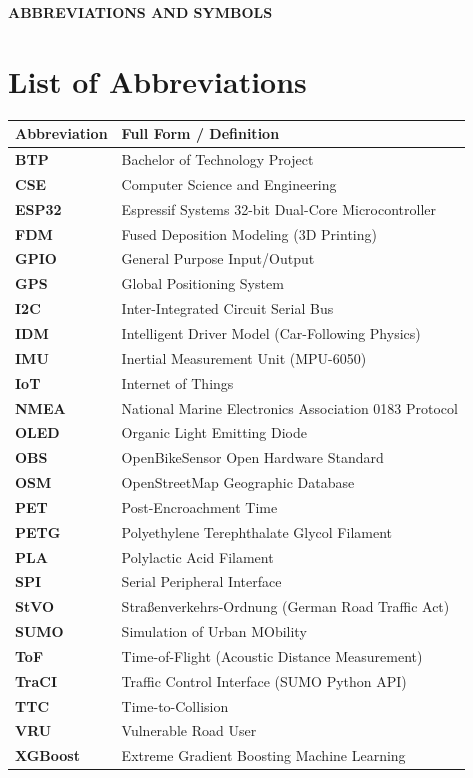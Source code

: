 \begin{center}
	\fontsize{16pt}{22pt}\selectfont \textbf{\MakeUppercase{Abbreviations and Symbols}}
\end{center}
\vspace{0.5cm}

\section*{List of Abbreviations}
\begin{table}[h!]
	\centering
	\setlength{\tabcolsep}{10pt}
	\renewcommand{\arraystretch}{1.25}
	\begin{tabularx}{\textwidth}{p{3.2cm}X}
		\toprule
		\textbf{Abbreviation} & \textbf{Full Form / Definition} \\
		\midrule
		\textbf{BTP} & Bachelor of Technology Project \\
		\textbf{CSE} & Computer Science and Engineering \\
		\textbf{ESP32} & Espressif Systems 32-bit Dual-Core Microcontroller \\
		\textbf{FDM} & Fused Deposition Modeling (3D Printing) \\
		\textbf{GPIO} & General Purpose Input/Output \\
		\textbf{GPS} & Global Positioning System \\
		\textbf{I2C} & Inter-Integrated Circuit Serial Bus \\
		\textbf{IDM} & Intelligent Driver Model (Car-Following Physics) \\
		\textbf{IMU} & Inertial Measurement Unit (MPU-6050) \\
		\textbf{IoT} & Internet of Things \\
		\textbf{NMEA} & National Marine Electronics Association 0183 Protocol \\
		\textbf{OLED} & Organic Light Emitting Diode \\
		\textbf{OBS} & OpenBikeSensor Open Hardware Standard \\
		\textbf{OSM} & OpenStreetMap Geographic Database \\
		\textbf{PET} & Post-Encroachment Time \\
		\textbf{PETG} & Polyethylene Terephthalate Glycol Filament \\
		\textbf{PLA} & Polylactic Acid Filament \\
		\textbf{SPI} & Serial Peripheral Interface \\
		\textbf{StVO} & Stra{\ss}enverkehrs-Ordnung (German Road Traffic Act) \\
		\textbf{SUMO} & Simulation of Urban MObility \\
		\textbf{ToF} & Time-of-Flight (Acoustic Distance Measurement) \\
		\textbf{TraCI} & Traffic Control Interface (SUMO Python API) \\
		\textbf{TTC} & Time-to-Collision \\
		\textbf{VRU} & Vulnerable Road User \\
		\textbf{XGBoost} & Extreme Gradient Boosting Machine Learning \\
		\bottomrule
	\end{tabularx}
\end{table}

